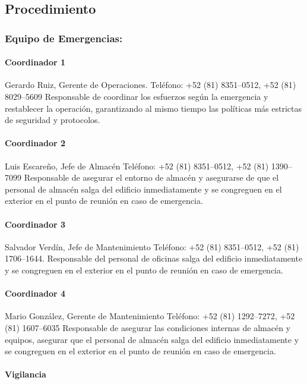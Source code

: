 \subsection{Procedimiento}
\subsubsection{Equipo de Emergencias:}
\paragraph{Coordinador 1}
Gerardo Ruiz, Gerente de Operaciones.
Teléfono: +52 (81) 8351--0512, +52 (81) 8029--5609
Responsable de coordinar los esfuerzos según la emergencia y restablecer la operación, garantizando al mismo tiempo las políticas más estrictas de seguridad y protocolos.

\paragraph{Coordinador 2}
Luis Escareño, Jefe de Almacén
Teléfono: +52 (81) 8351--0512, +52 (81) 1390--7099
Responsable de asegurar el entorno de almacén y asegurarse de que el personal de almacén salga del edificio inmediatamente y se congreguen en el exterior en el punto de reunión en caso de emergencia.

\paragraph{Coordinador 3}
Salvador Verdín, Jefe de Mantenimiento
Teléfono: +52 (81) 8351--0512, +52 (81) 1706--1644.
Responsable del personal de oficinas salga del edificio inmediatamente y se congreguen en el exterior en el punto de reunión en caso de emergencia.

\paragraph{Coordinador 4}
Mario González, Gerente de Mantenimiento
Teléfono: +52 (81) 1292--7272, +52 (81) 1607--6035
Responsable de asegurar las condiciones internas de almacén y equipos, asegurar que el personal de almacén salga del edificio inmediatamente y se congreguen en el exterior en el punto de reunión en caso de emergencia.

\paragraph{Vigilancia}

